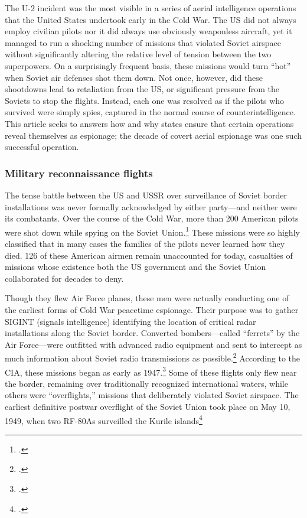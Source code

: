 \documentclass[14pt]{extarticle}
\begin{document}
The U-2 incident was the most visible in a series of aerial intelligence operations that the United States undertook early in the Cold War. The US did not always employ civilian pilots nor it did always use obviously weaponless aircraft, yet it managed to run a shocking number of missions that violated Soviet airspace without significantly altering the relative level of tension between the two superpowers. On a surprisingly frequent basis, these missions would turn \enquote{hot} when Soviet air defenses shot them down. Not once, however, did these shootdowns lead to retaliation from the US, or significant pressure from the Soviets to stop the flights. Instead, each one was resolved as if the pilots who survived were simply spies, captured in the normal course of counterintelligence. This article seeks to answers how and why states ensure that certain operations reveal themselves as espionage; the decade of covert aerial espionage was one such successful operation.

\subsubsection{Military reconnaissance flights}
The tense battle between the US and USSR over surveillance of Soviet border installations was never formally acknowledged by either party---and neither were its combatants. Over the course of the Cold War, more than 200 American pilots were shot down while spying on the Soviet Union.\footcite{glenshaw_secret_2017} These missions were so highly classified that in many cases the families of the pilots never learned how they died. 126 of these American airmen remain unaccounted for today, casualties of missions whose existence both the US government and the Soviet Union collaborated for decades to deny.

Though they flew Air Force planes, these men were actually conducting one of the earliest forms of Cold War peacetime espionage. Their purpose was to gather SIGINT (signals intelligence) identifying the location of critical radar installations along the Soviet border. Converted bombers---called \enquote{ferrets} by the Air Force---were outfitted with advanced radio equipment and sent to intercept as much information about Soviet radio transmissions as possible.\footcite[p.~4]{peterson_maybe_1993} According to the CIA, these missions began as early as 1947.\footcite[p.~4]{peterson_maybe_1993} Some of these flights only flew near the border, remaining over traditionally recognized international waters, while others were \enquote{overflights,} missions that deliberately violated Soviet airspace. The earliest definitive postwar overflight of the Soviet Union took place on May 10, 1949, when two RF-80As surveilled the Kurile islands\footcite[p.~8]{peebles_shadow_2000}
\end{document}
